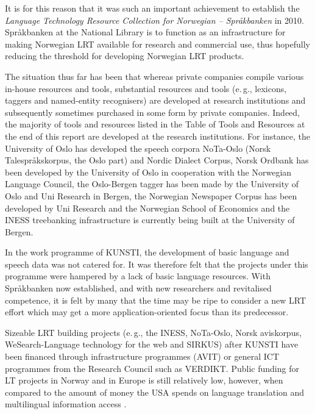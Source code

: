 \begin{multicols}{2}

It is for this reason that it was such an important achievement to establish the \textit{Language Technology Resource Collection for Norwegian -- Språkbanken} in 2010. %
Språkbanken at the National Library is to function as an infrastructure for making Norwegian LRT available for research and commercial use, thus hopefully reducing the threshold for developing Norwegian LRT products. 

The situation thus far has been that whereas private companies compile various in-house resources and tools,
substantial resources and tools (e.\,g., lexicons, taggers and named-entity recognisers) are developed at research institutions and subsequently sometimes purchased in some form by private companies. 
Indeed, the majority of tools and resources listed in the Table of Tools and Resources at the end of this report are developed at the research institutions. 
For instance, the University of Oslo has developed the speech corpora NoTa-Oslo (Norsk Talespråkskorpus, the Oslo part) and Nordic Dialect Corpus, Norsk Ordbank has been developed by the University of Oslo in cooperation with the Norwegian Language Council, the Oslo-Bergen tagger has been made by the University of Oslo and Uni Research in Bergen, the Norwegian Newspaper Corpus has been developed by Uni Research and the Norwegian School of Economics and the INESS treebanking infrastructure is currently being built at the University of Bergen.

In the work programme of KUNSTI, the development of basic language and speech data was not catered for. 
It was therefore felt that the projects under this programme were hampered by a lack of basic language resources. 
With Språkbanken now established, and with new researchers and revitalised competence, it is felt by many that the time may be ripe to consider a new LRT effort which may get a more application-oriented focus than its predecessor. 

Sizeable LRT building projects (e.\,g., the INESS, NoTa-Oslo, Norsk
aviskorpus, WeSearch-Language technology for the web and SIRKUS) after KUNSTI have been financed through infrastructure programmes (AVIT) or general ICT programmes from the Research Council such as VERDIKT. 
Public funding for LT projects in Norway and in Europe is still relatively low, however, when compared to the amount of money the USA spends on language translation and multilingual information access \cite{laz1}.


\end{multicols}
